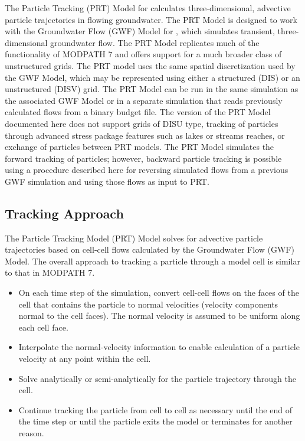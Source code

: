 
The Particle Tracking (PRT) Model for \mf calculates three-dimensional, advective particle trajectories in flowing groundwater. The PRT Model is designed to work with the Groundwater Flow (GWF) Model \citep{modflow6gwf} for \mf, which simulates transient, three-dimensional groundwater flow. The PRT Model replicates much of the functionality of MODPATH 7 \citep{pollock2016modpath7} and offers support for a much broader class of unstructured grids. The PRT model uses the same spatial discretization used by the GWF Model, which may be represented using either a structured (DIS) or an unstructured (DISV) grid. The PRT Model can be run in the same simulation as the associated GWF Model or in a separate simulation that reads previously calculated flows from a binary budget file. The version of the PRT Model documented here does not support grids of DISU type, tracking of particles through advanced stress package features such as lakes or streams reaches, or exchange of particles between PRT models.  The PRT Model simulates the forward tracking of particles; however, backward particle tracking is possible using a procedure described here for reversing simulated flows from a previous GWF simulation and using those flows as input to PRT. 

\subsection{Tracking Approach} \label{sec:trackingapproach}

The Particle Tracking Model (PRT) Model solves for advective particle trajectories based on cell-cell flows calculated by the Groundwater Flow (GWF) Model. The overall approach to tracking a particle through a model cell is similar to that in MODPATH 7.

\begin{itemize}
\item On each time step of the simulation, convert cell-cell flows on the faces of the cell that contains the particle to normal velocities (velocity components normal to the cell faces). The normal velocity is assumed to be uniform along each cell face.
\item Interpolate the normal-velocity information to enable calculation of a particle velocity at any point within the cell.
\item Solve analytically or semi-analytically for the particle trajectory through the cell.
\item Continue tracking the particle from cell to cell as necessary until the end of the time step or until the particle exits the model or terminates for another reason.
\end{itemize}

